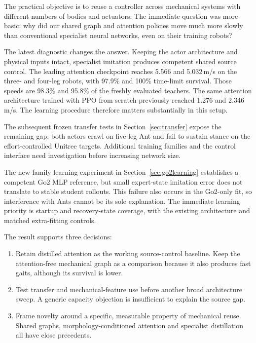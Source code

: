 \documentclass[11pt,letterpaper]{article}
\begin{document}
The practical objective is to reuse a controller across mechanical systems with
different numbers of bodies and actuators. The immediate question was more basic:
why did our shared graph and attention policies move much more slowly than
conventional specialist neural networks, even on their training robots?

The latest diagnostic changes the answer. Keeping the actor architecture and
physical inputs intact, specialist imitation produces competent shared source
control. The leading attention checkpoint reaches 5.566 and 5.032\,m/s on the
three- and four-leg robots, with 97.9\% and 100\% time-limit survival. Those speeds
are 98.3\% and 95.8\% of the freshly evaluated teachers. The same attention
architecture trained with PPO from scratch previously reached 1.276 and
2.346\,m/s. The learning procedure therefore matters substantially in this setup.

The subsequent frozen transfer tests in Section~\ref{sec:transfer} expose the
remaining gap: both actors crawl on five-leg Ant and fail to sustain stance on
the effort-controlled Unitree targets. Additional training families and the
control interface need investigation before increasing network size.

The new-family learning experiment in Section~\ref{sec:go2learning} establishes
a competent Go2 MLP reference, but small expert-state imitation error does not
translate to stable student rollouts. This failure also occurs in the Go2-only
fit, so interference with Ants cannot be its sole explanation. The immediate
learning priority is startup and recovery-state coverage, with the existing
architecture and matched extra-fitting controls.

The result supports three decisions:
\begin{enumerate}
\item Retain distilled attention as the working source-control baseline. Keep the
attention-free mechanical graph as a comparison because it also produces fast
gaits, although its survival is lower.
\item Test transfer and mechanical-feature use before another broad architecture
sweep. A generic capacity objection is insufficient to explain the source gap.
\item Frame novelty around a specific, measurable property of mechanical reuse.
Shared graphs, morphology-conditioned attention and specialist distillation all
have close precedents.
\end{enumerate}
\end{document}
